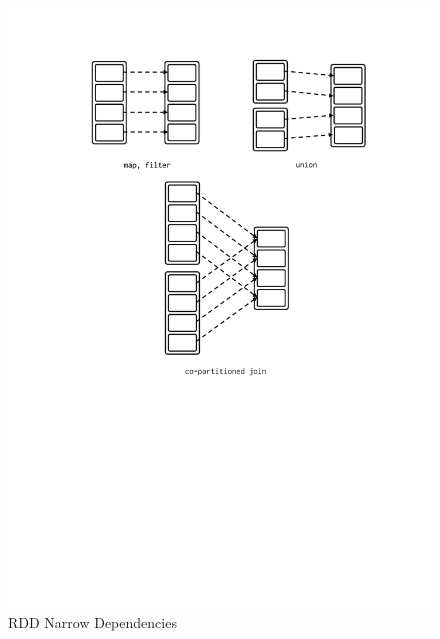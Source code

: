 \begin{itemize}
\begin{figure}[p]
        \includegraphics[clip,trim=4cm 11.5cm 3.1cm 2.5cm]{narrow-dep.pdf}
        \caption{RDD Narrow Dependencies}
        \label{fig:sp:narrow-dep}

\end{figure}
\end{itemize}
